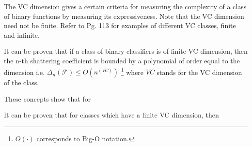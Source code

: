 The VC dimension gives a certain criteria for measuring the complexity of a class of binary functions by measuring its expressiveness. Note that the VC dimension need not be finite. Refer to \cite{cherkassky-learning2007} Pg. 113 for examples of different VC classes, finite and infinite.

It can be proven that if a class of binary classifiers is of finite VC dimension, then the n-th shattering coefficient is bounded by a polynomial of order equal to the dimension 
i.e. $\Delta_n(\mathcal {F}) \leq O(n^(VC))$ \footnote{$O(\cdot)$ corresponds to Big-O notation.} where $VC$ stands for the VC dimension of the class.

These concepts show that for

It can be proven that for classes which have a finite VC dimension, then

